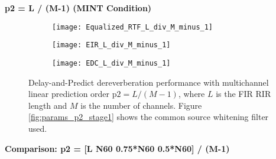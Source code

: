 \textbf{p2 = L / (M-1) (MINT Condition)}

\begin{figure}[H]
	\centering
	\begin{subfigure}[b]{0.32\textwidth}
		\centering
		\texttt{[image: Equalized\_RTF\_L\_div\_M\_minus\_1]}
	\end{subfigure}
	\hfill
	\begin{subfigure}[b]{0.32\textwidth}
		\centering
		\texttt{[image: EIR\_L\_div\_M\_minus\_1]}
	\end{subfigure}
	\hfill
	\begin{subfigure}[b]{0.32\textwidth}
		\centering
		\texttt{[image: EDC\_L\_div\_M\_minus\_1]}
	\end{subfigure}
	\hfill
	\caption{Delay-and-Predict dereverberation performance with multichannel linear prediction order $\mathrm{p2} = L / (M-1)$, where $L$ is the FIR RIR length and $M$ is the number of channels. Figure \ref{fig:params_p2_stage1} shows the common source whitening filter used.}
	\label{fig:params_p2_L}
\end{figure}

\textbf{Comparison: p2 = [L  N60  0.75*N60  0.5*N60] / (M-1)}

